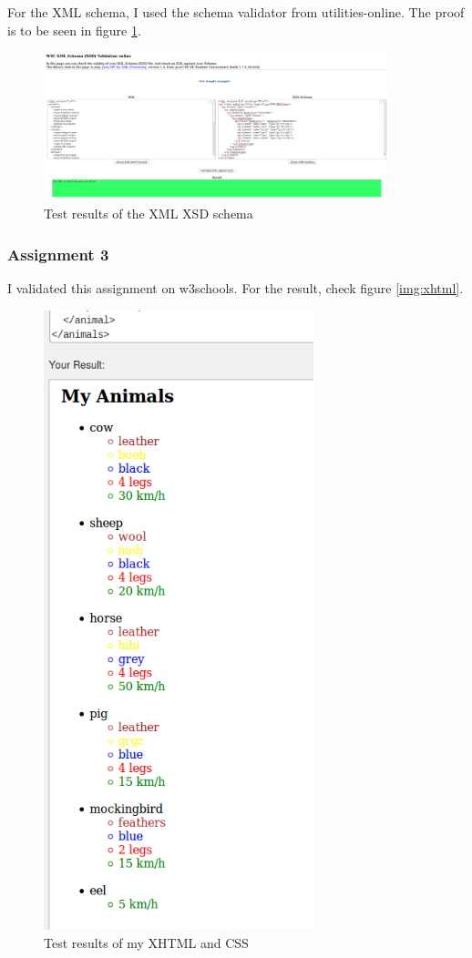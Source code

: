 For the XML schema, I used the schema validator from utilities-online. The proof is to be seen in figure \ref{fig:xmlxsdtest}.

\begin{figure}[h]
	\centering
	\includegraphics[width=100mm]{img/xmlxsdtest.png}
	\caption{Test results of the XML XSD schema}\label{fig:xmlxsdtest}
\end{figure}

\subsubsection{Assignment 3}
I validated this assignment on w3schools. For the result, check figure \ref{img:xhtml}.

\begin{figure}[h]
	\centering
	\includegraphics[height=180mm]{img/xhtml.png}
	\caption{Test results of my XHTML and CSS}\label{fig:xhtml}
\end{figure}

